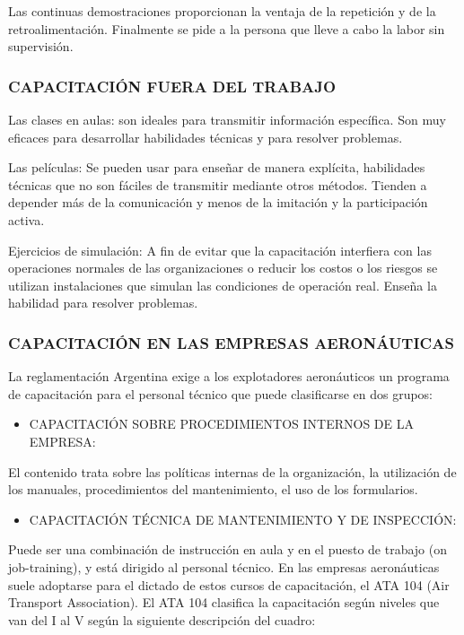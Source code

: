Las continuas demostraciones proporcionan la ventaja de la repetición y de la retroalimentación. Finalmente se pide a la persona que lleve a cabo la labor sin supervisión.

\subsubsection*{CAPACITACIÓN FUERA DEL TRABAJO}
Las clases en aulas: son ideales para transmitir información específica. Son muy eficaces para desarrollar habilidades técnicas y para resolver problemas.



Las películas: Se pueden usar para enseñar de manera explícita, habilidades técnicas que no son fáciles de transmitir mediante otros métodos. Tienden a depender más de la comunicación y menos de la imitación y la participación activa.

Ejercicios de simulación: A fin de evitar que la capacitación interfiera con las operaciones normales de las organizaciones o reducir los costos o los riesgos se utilizan instalaciones que simulan las condiciones de operación real. Enseña la habilidad para resolver problemas.

\subsubsection*{CAPACITACIÓN EN LAS EMPRESAS AERONÁUTICAS}
La reglamentación Argentina exige a los explotadores aeronáuticos un programa de capacitación para el personal técnico que puede clasificarse en dos grupos:

\begin{itemize}
  \item CAPACITACIÓN SOBRE PROCEDIMIENTOS INTERNOS DE LA EMPRESA:
\end{itemize}
El contenido trata sobre las políticas internas de la organización, la utilización de los manuales, procedimientos del mantenimiento, el uso de los formularios.

\begin{itemize}
  \item CAPACITACIÓN TÉCNICA DE MANTENIMIENTO Y DE INSPECCIÓN:
\end{itemize}
Puede ser una combinación de instrucción en aula y en el puesto de trabajo (on job-training), y está dirigido al personal técnico. En las empresas aeronáuticas suele adoptarse para el dictado de estos cursos de capacitación, el ATA 104 (Air Transport Association). El ATA 104 clasifica la capacitación según niveles que van del I al V según la siguiente descripción del cuadro:


